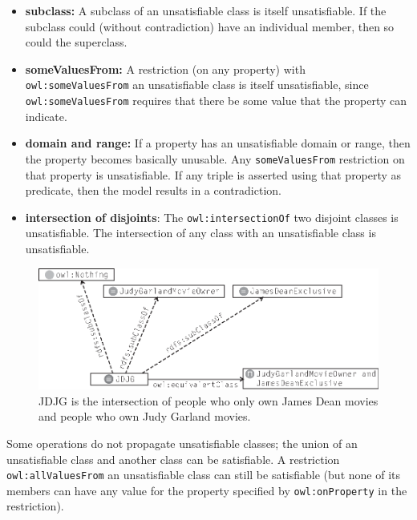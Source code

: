 \begin{itemize}
\item \textbf{subclass:} A subclass of an unsatisfiable class is itself unsatisfiable.
If the subclass could (without contradiction) have an individual member,
then so could the superclass.

\item \textbf{someValuesFrom:} A restriction (on any property) with \texttt{owl:someValuesFrom}
an unsatisfiable
class is itself unsatisfiable, since \texttt{owl:someValuesFrom} requires that
there be some value that the property can indicate.

\item \textbf{domain and range:} If a property has an unsatisfiable domain or range,
then the property becomes basically unusable. Any \texttt{someValuesFrom}
restriction on that property is unsatisfiable. If any triple is asserted
using that property as predicate, then the model results in a
contradiction.

\item \textbf{intersection of disjoints}: The \texttt{owl:intersectionOf} two disjoint classes
is unsatisfiable. The intersection of any class with an unsatisfiable
class is unsatisfiable.
\end{itemize}


\begin{figure}
\centering
\includegraphics[width=5in]{media/ch13/f13-08.eps}
\caption{JDJG is the intersection of people who only own James Dean movies and
people who own Judy Garland movies.}
\label{fig:ch13.08}
\end{figure}



Some operations do not propagate unsatisfiable classes; the union of an
unsatisfiable class and another class can be satisfiable. A restriction
\texttt{owl:allValuesFrom} an unsatisfiable class can still be satisfiable (but
none of its members can have any value for the property specified by
\texttt{owl:onProperty} in the restriction).

